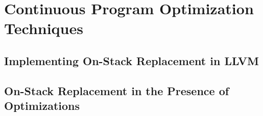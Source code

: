 \chapter{Continuous Program Optimization Techniques}

\section{Implementing On-Stack Replacement in LLVM}

\section{On-Stack Replacement in the Presence of Optimizations}
